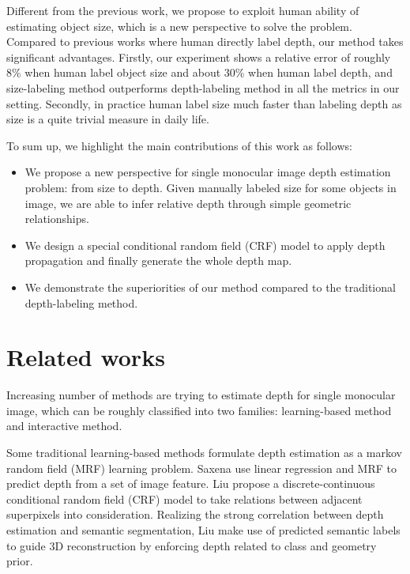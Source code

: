 \documentclass[10pt,twocolumn,letterpaper]{article}
\begin{document}
Different from the previous work, we propose to exploit human ability of estimating object size, which is a new perspective to solve the problem. Compared to previous works where human directly label depth, our method takes significant advantages. Firstly, our experiment shows a relative error of roughly 8\% when human label object size and about 30\% when human label depth, and size-labeling method outperforms depth-labeling method in all the metrics in our setting. Secondly, in practice human label size much faster than labeling depth as size is a quite trivial measure in daily life.

To sum up, we highlight the main contributions of this work as follows:
\begin{itemize}
\item We propose a new perspective for single monocular image depth estimation problem: from size to depth. Given manually labeled size for some objects in image, we are able to infer relative depth through simple geometric relationships. 
\item We design a special conditional random field (CRF) model to apply depth propagation and finally generate the whole depth map.
\item We demonstrate the superiorities of our method compared to the traditional depth-labeling method.
\end{itemize}


\section{Related works}

Increasing number of methods are trying to estimate depth for single monocular image, which can be roughly classified into two families: learning-based method and interactive method.

Some traditional learning-based methods formulate depth estimation as a markov random field (MRF) learning problem. Saxena \etal \cite{NIPS2005_2921} use linear regression and MRF to predict depth from a set of image feature. Liu \etal \cite{Liu_2014_CVPR} propose a discrete-continuous conditional random field (CRF) model to take relations between adjacent superpixels into consideration. Realizing the strong correlation between depth estimation and semantic segmentation, Liu \etal \cite{Liu+al:CVPR10} make use of predicted semantic labels to guide 3D reconstruction by enforcing depth related to class and geometry prior.
\end{document}
